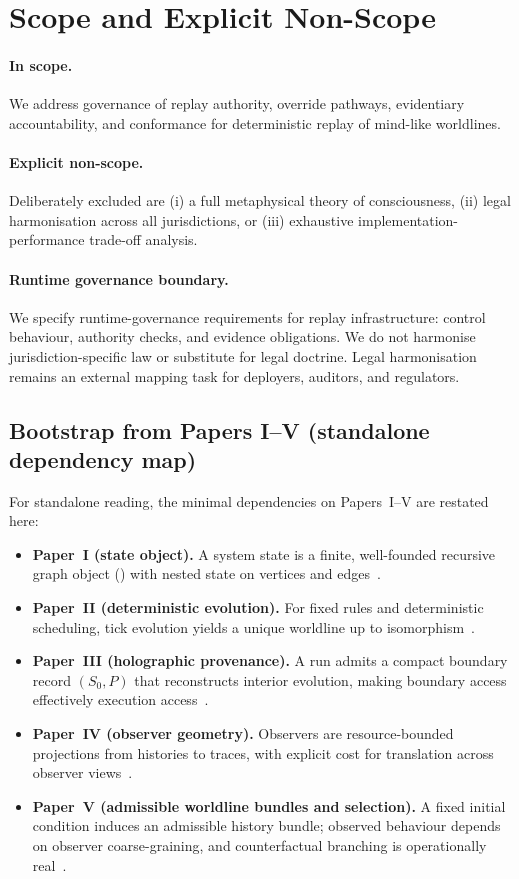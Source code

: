 \documentclass[11pt]{article}
\theoremstyle{definition}
\theoremstyle{plain}
\theoremstyle{remark}
\DeclareRobustCommand{\WARP}{\ifmmode\mathit{WARP}\else{\upshape\scshape warp}\fi}
\begin{document}
\section{Scope and Explicit Non-Scope}
\label{sec:background}

\paragraph{In scope.}
We address governance of replay authority, override pathways, evidentiary accountability, and
conformance for deterministic replay of mind-like worldlines.

\paragraph{Explicit non-scope.}
Deliberately excluded are (i) a full metaphysical theory of consciousness,
(ii) legal harmonisation across all jurisdictions, or
(iii) exhaustive implementation-performance trade-off analysis.

\paragraph{Runtime governance boundary.}
We specify runtime-governance requirements for replay infrastructure: control behaviour,
authority checks, and evidence obligations. We do not harmonise jurisdiction-specific law or
substitute for legal doctrine. Legal harmonisation remains an external mapping task for deployers,
auditors, and regulators.

\subsection{Bootstrap from Papers I--V (standalone dependency map)}
\label{sec:bootstrap}
For standalone reading, the minimal dependencies on Papers~I--V are restated here:

\begin{itemize}[leftmargin=*]
  \item \textbf{Paper~I (state object).}
  A system state is a finite, well-founded recursive graph object (\WARP{}) with nested state on vertices and edges~\cite{ross_paper_i}.
  \item \textbf{Paper~II (deterministic evolution).}
  For fixed rules and deterministic scheduling, tick evolution yields a unique worldline up to isomorphism~\cite{ross_paper_ii}.
  \item \textbf{Paper~III (holographic provenance).}
  A run admits a compact boundary record $(S_0,P)$ that reconstructs interior evolution, making boundary access effectively execution access~\cite{ross_paper_iii}.
  \item \textbf{Paper~IV (observer geometry).}
  Observers are resource-bounded projections from histories to traces, with explicit cost for translation across observer views~\cite{ross_paper_iv}.
  \item \textbf{Paper~V (admissible worldline bundles and selection).}
  A fixed initial condition induces an admissible history bundle; observed behaviour depends on observer coarse-graining, and counterfactual branching is operationally real~\cite{ross_paper_v}.
\end{itemize}
\end{document}
